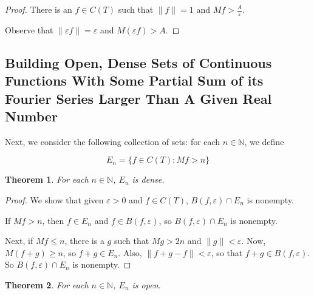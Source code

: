 \documentclass{amsart}
\newcommand{\vep}{\varepsilon}
\newcommand{\N}{\mathbb{N}}
\newcommand{\norm}[1]{\|#1\|}
\newtheorem{thm}{Theorem}[section]
\theoremstyle{definition}
\begin{document}
\begin{proof}
There is an $f \in C(T)$ such that $\norm{f} = 1$ and $Mf > \frac{A}{\vep}$.

Observe that $\norm{\vep f} = \vep$ and $M(\vep f) > A$.

\end{proof}

\subsection{Building Open, Dense Sets of Continuous Functions With Some Partial Sum of its Fourier Series Larger Than A Given Real Number}

Next, we consider the following collection of sets: for each $n \in \N$, we define

\begin{displaymath}
E_n = \{f \in C(T) : Mf > n\}
\end{displaymath}

\begin{thm}
For each $n \in \N$, $E_n$ is dense.
\end{thm}

\begin{proof}

We show that given $\vep>0$ and $f \in C(T)$, $B(f,\vep) \cap E_n$ is nonempty. 

If $Mf > n$, then $f \in E_n$ and $f \in B(f, \vep)$, so $B(f, \vep) \cap E_n$ is nonempty.

Next, if $Mf \leq n$, there is a $g$ such that $Mg > 2n$ and $\norm{g} < \vep$. 
Now, $M(f+g) \geq n$, so $f+g \in E_n$. 
Also, $\norm{f+g -f} < \vep$, so that $f+g \in B(f, \vep)$. 
So $B(f, \vep) \cap E_n$ is nonempty.

\end{proof}

\begin{thm}
For each $n \in \N$, $E_n$ is open.
\end{thm}
\end{document}
